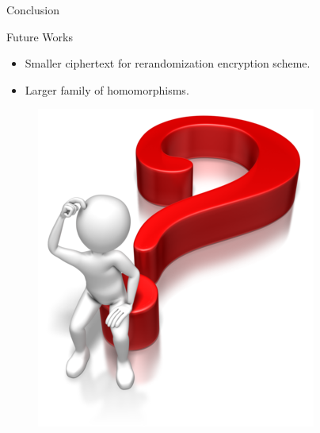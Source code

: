 % 
%  
%  

\begin{frame}{Conclusion}
  \begin{block}{Future Works}
    \begin{itemize}
    \item Smaller ciphertext for rerandomization encryption scheme.
    \item Larger family of homomorphisms.
    \end{itemize}
  \end{block}
  \pause
  \begin{figure}
  \centering
  \includegraphics[scale = 0.3]{./images/questions.png}
  \end{figure}
\end{frame}
